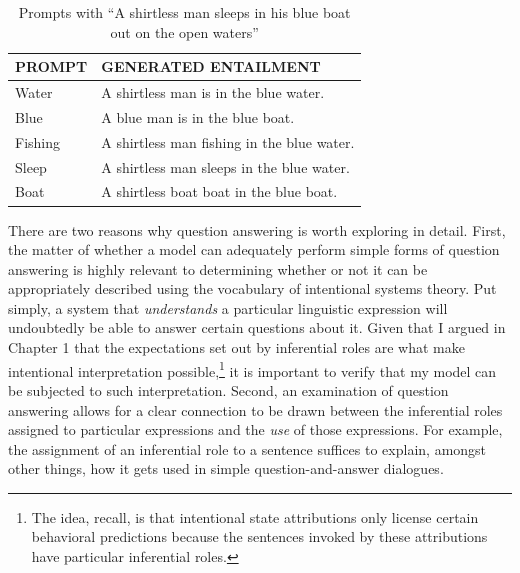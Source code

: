 \begin{table}[!t]
\begin{center} 
\caption{Prompts with ``A shirtless man sleeps in his blue boat out on the open waters''} 
\vskip 0.15in
\label{prompt} 

\setlength{\tabcolsep}{25pt}
\begin{tabular}{ll} 

\hline

\rule{0pt}{3ex} PROMPT & \qquad \qquad \quad GENERATED ENTAILMENT \\

\hline
\rule{0pt}{3ex}\quad Water & \qquad \qquad A shirtless man is in the blue water.\\
\quad Blue & \qquad \qquad A blue man is in the blue boat. \\
\quad Fishing & \qquad \qquad A shirtless man fishing in the blue water. \\
\quad Sleep & \qquad \qquad A shirtless man sleeps in the blue water. \\
\quad Boat & \qquad \qquad A shirtless boat boat in the blue boat. \\
\hline
\end{tabular}
\end{center} 
\end{table}

There are two reasons why question answering is worth exploring in detail. First, the matter of whether a model can adequately perform simple forms of question answering is highly relevant to determining whether or not it can be appropriately described using the vocabulary of intentional systems theory. Put simply, a system that \textit{understands} a particular linguistic expression will undoubtedly be able to answer certain questions about it. Given that I argued in Chapter 1 that the expectations set out by inferential roles are what make intentional interpretation possible,\footnote{The idea, recall, is that intentional state attributions only license certain behavioral predictions because the sentences invoked by these attributions have particular inferential roles.} it is important to verify that my model can be subjected to such interpretation. Second, an examination of question answering allows for a clear connection to be drawn between the inferential roles assigned to particular expressions and the \textit{use} of those expressions. For example, the assignment of an inferential role to a sentence suffices to explain, amongst other things, how it gets used in simple question-and-answer dialogues.

